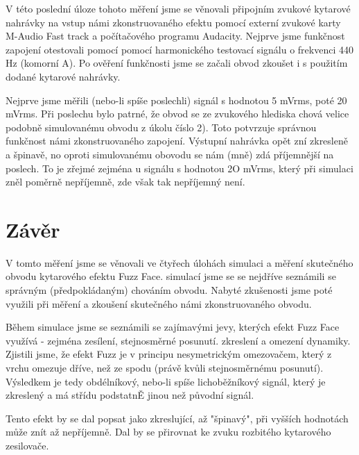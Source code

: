 \documentclass[a4paper, czech]{article}
\begin{document}
V této poslední úloze tohoto měření jsme se věnovali připojním zvukové kytarové nahrávky na vstup námi zkonstruovaného efektu pomocí externí zvukové karty M-Audio Fast track a počítačového programu Audacity.
Nejprve jsme funkčnost zapojení otestovali pomocí pomocí harmonického testovací signálu o frekvenci 440 Hz (komorní A).
Po ověření funkčnosti jsme se začali obvod zkoušet i s použitím dodané kytarové nahrávky.

Nejprve jsme měřili (nebo-li spíše poslechli) signál s hodnotou 5 mVrms, poté 20 mVrms.
Při poslechu bylo patrné, že obvod se ze zvukového hlediska chová velice podobně simulovanému obvodu z úkolu číslo 2).
Toto potvrzuje správnou funkčnost námi zkonstruovaného zapojení.
Výstupní nahrávka opět zní zkresleně a špinavě, no oproti simulovanému obovodu se nám (mně) zdá příjemnější na poslech.
To je zřejmé zejména u signálu s hodnotou 2O mVrms, který při simulaci zněl poměrně nepříjemně, zde však tak nepříjemný není.

\section{Závěr}

V tomto měření jsme se věnovali ve čtyřech úlohách simulaci a měření skutečného obvodu kytarového efektu Fuzz Face.
simulací jsme se se nejdříve seznámili se správným (předpokládaným) chováním obvodu.
Nabyté zkušenosti jsme poté využili při měření a zkoušení skutečného námi zkonstruovaného obvodu.

Během simulace jsme se seznámili se zajímavými jevy, kterých efekt Fuzz Face využívá - zejména zesílení, stejnosměrné posunutí. zkreslení a omezení dynamiky.
Zjistili jsme, že efekt Fuzz je v principu nesymetrickým omezovačem, který z vrchu omezuje dříve, než ze spodu (právě kvůli stejnosměrnému posunutí).
Výsledkem je tedy obdélníkový, nebo-li spíše lichoběžníkový signál, který je zkreslený a má střídu podstatnĚ jinou než původní signál.

Tento efekt by se dal popsat jako zkreslující, až "špinavý", při vyšších hodnotách může znít až nepříjemně.
Dal by se přirovnat ke zvuku rozbitého kytarového zesilovače.
\end{document}
